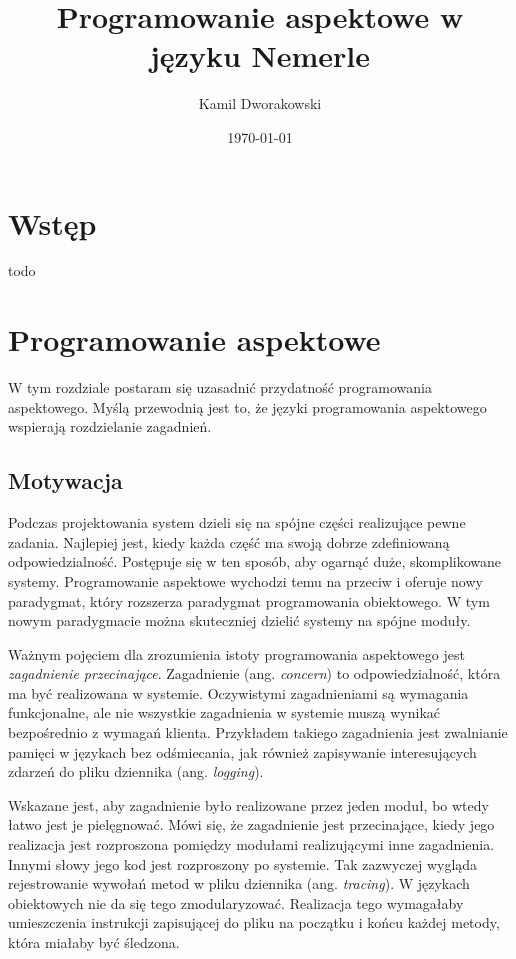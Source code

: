 \documentclass[a4paper,12pt]{mwbk}
\author{Kamil Dworakowski}
\title{Programowanie aspektowe w języku Nemerle}
\date{\today}
\begin{document}
\maketitle

\tableofcontents

\chapter{ Wstęp }

    todo

\chapter{Programowanie aspektowe}
W tym rozdziale postaram się uzasadnić przydatność programowania aspektowego.
Myślą przewodnią jest to, że języki programowania aspektowego wspierają
rozdzielanie zagadnień.

\section{Motywacja}

Podczas projektowania system dzieli się na spójne części realizujące pewne
zadania. Najlepiej jest, kiedy każda część ma swoją dobrze zdefiniowaną
odpowiedzialność.  Postępuje się w ten sposób, aby ogarnąć duże, skomplikowane
systemy. Programowanie aspektowe wychodzi temu na przeciw i oferuje nowy
paradygmat, który rozszerza paradygmat programowania obiektowego. W tym nowym
paradygmacie można skuteczniej dzielić systemy na spójne moduły.

Ważnym pojęciem dla zrozumienia istoty programowania aspektowego jest
\emph{zagadnienie przecinające}.  Zagadnienie (ang. \emph{concern}) to
odpowiedzialność, która ma być realizowana w systemie.  Oczywistymi
zagadnieniami są wymagania funkcjonalne, ale nie wszystkie zagadnienia w
systemie muszą wynikać bezpośrednio z wymagań klienta. Przykładem takiego
zagadnienia jest zwalnianie pamięci w językach bez odśmiecania, jak również 
zapisywanie interesujących zdarzeń do pliku
dziennika (ang. \emph{logging}).

Wskazane jest, aby zagadnienie było realizowane przez jeden moduł, bo wtedy łatwo
jest je pielęgnować.  Mówi się, że zagadnienie jest przecinające, kiedy jego
realizacja jest rozproszona pomiędzy modułami realizującymi inne zagadnienia.
Innymi słowy jego kod jest rozproszony po systemie. Tak zazwyczej wygląda
rejestrowanie wywołań metod w pliku dziennika (ang. \emph{tracing}).  W
językach obiektowych nie da się tego zmodularyzować. Realizacja tego wymagałaby
umieszczenia instrukcji zapisującej do pliku na początku i końcu każdej metody,
która miałaby być śledzona.
\end{document}
